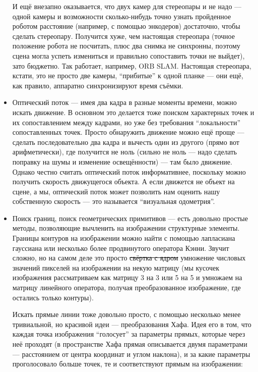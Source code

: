 \documentclass{../../text-style}
\begin{document}
\begin{itemize}
        И ещё внезапно оказывается, что двух камер для стереопары и не надо --- одной камеры и возможности сколько-нибудь точно узнать пройденное роботом расстояние (например, с помощью энкодеров) достаточно, чтобы сделать стереопару.
        Получится хуже, чем настоящая стереопара (точное положение робота не посчитать, плюс два снимка не синхронны, поэтому сцена могла успеть измениться и правильно сопоставить точки не выйдет), зато бюджетно.
        Так работает, например, ORB SLAM.
        Настоящая стереопара, кстати, это не просто две камеры, \enquote{прибитые} к одной планке --- они ещё, как правило, аппаратно синхронизируют время съёмки. 
    \item Оптический поток --- имея два кадра в разные моменты времени, можно искать движение.
        В основном это делается тоже поиском характерных точек и их сопоставлением между кадрами, но уже без требования \enquote{локальности} сопоставленных точек.
        Просто обнаружить движение можно ещё проще --- сделать последовательно два кадра и вычесть один из другого (прямо вот арифметически), где получится не ноль (сильно не ноль --- надо сделать поправку на шумы и изменение освещённости) --- там было движение.
        Однако честно считать оптический поток информативнее, поскольку можно получить скорость движущегося объекта.
        А если движется не объект на сцене, а мы, оптический поток может позволить нам оценить нашу собственную скорость --- это называется \enquote{визуальная одометрия}.
    \item Поиск границ, поиск геометрических примитивов --- есть довольно простые методы, позволяющие вычленить на изображении структурные элементы.
        Границы контуров на изображении можно найти с помощью лапласиана гауссиана или несколько более продвинутого оператора Кэнни.
        Звучит сложно, но на самом деле это просто \sout{свёртка с ядром} умножение числовых значений пикселей на изображении на некую матрицу (мы кусочек изображения рассматриваем как матрицу 3 на 3 или 5 на 5 и умножаем на матрицу линейного оператора, получая преобразованное изображение, где остались только контуры).
        
        Искать прямые линии тоже довольно просто, с помощью несколько менее тривиальной, но красивой идеи --- преобразования Хафа.
        Идея его в том, что каждая точка изображения \enquote{голосует} за параметры прямых, которые через неё проходят (в пространстве Хафа прямая описывается двумя параметрами --- расстоянием от центра координат и углом наклона), и за какие параметры проголосовало больше точек, те и соответствуют прямым на изображении:


\end{itemize}
\end{document}
